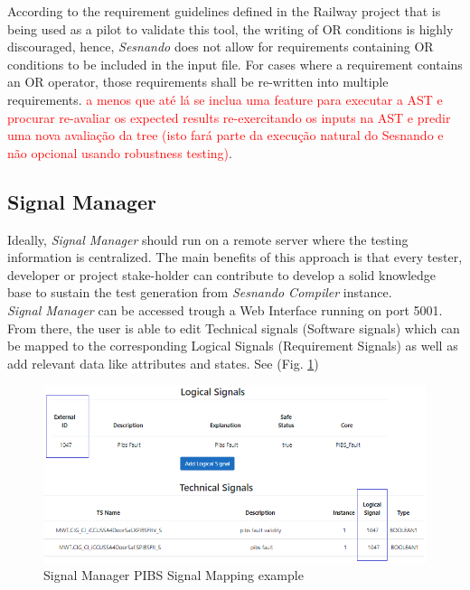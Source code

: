 According to the requirement guidelines defined in the Railway project that is being used as a pilot to validate this tool, the writing of OR conditions is highly discouraged, hence, \textit{Sesnando} does not allow for requirements containing OR conditions to be included in the input file. For cases where a requirement contains an OR operator, those requirements shall be re-written into multiple requirements. \textcolor{red}{a menos que até lá se inclua uma feature para executar a AST e procurar re-avaliar os expected results re-exercitando os inputs na AST e predir uma nova avaliação da tree (isto fará parte da execução natural do Sesnando e não opcional usando robustness testing)}.\\


\subsection{Signal Manager}
\label{subsec:signal_manager}

Ideally, \textit{Signal Manager} should run on a remote server where the testing information is centralized. The main benefits of this approach is that every tester, developer or project stake-holder can contribute to develop a solid knowledge base to sustain the test generation from \textit{Sesnando Compiler} instance.\\

\textit{Signal Manager} can be accessed trough a Web Interface running on port 5001. From there, the user is able to edit Technical signals (Software signals) which can be mapped to the corresponding Logical Signals (Requirement Signals) as well as add relevant data like attributes and states. See (Fig. \ref{fig:signal_manager_pibs})

\begin{figure}[H]
    \centering
    \includegraphics[width=\textwidth]{images/signal_manager_signals_pibs.PNG}
    \caption{Signal Manager PIBS Signal Mapping example}
    \label{fig:signal_manager_pibs}
\end{figure}

